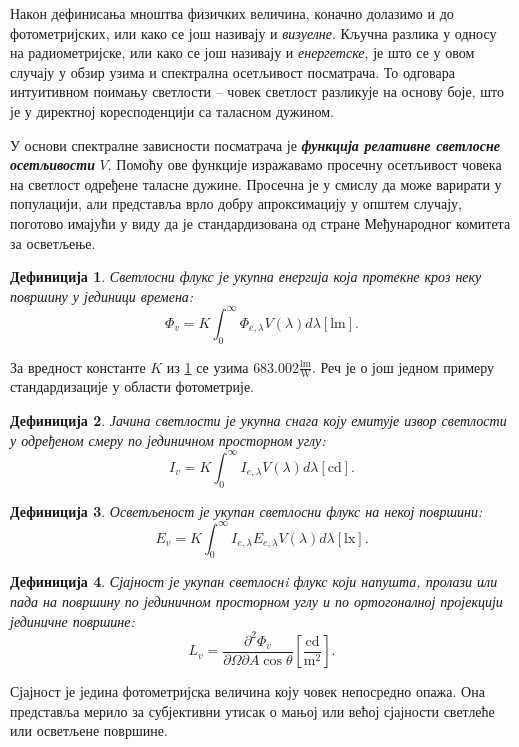 \documentclass[12pt, a4paper, twoside]{book}
\numberwithin{equation}{chapter}
\numberwithin{theorem}{section}
\newtheorem{definition}{Дефиниција}
\numberwithin{definition}{section}
\numberwithin{definitionChapter}{chapter}
\begin{document}
Након дефинисања мноштва физичких величина, коначно долазимо и до фотометријских, или како се
још називају и \textit{визуелне}. Кључна разлика у односу на радиометријске, или како се још
називају и \textit{енергетске}, је што се у овом случају у обзир узима и спектрална
осетљивост посматрача. То одговара интуитивном поимању светлости -- човек светлост разликује на
основу боје, што је у директној коресподенцији са таласном дужином.

У основи спектралне зависности посматрача је \textbf{\textit{функција релативне светлосне осетљивости}} $V$.
Помоћу ове функције изражавамо просечну осетљивост човека на светлост одређене таласне дужине.
Просечна је у смислу да може варирати у популацији, али представља врло добру апроксимацију
у општем случају, поготово имајући у виду да је стандардизована од стране Међународног комитета
за осветљење.

\begin{definition}
	Светлосни флукс је укупна енергија која протекне кроз неку површину у јединици времена:
	$$\Phi_v = K\int_{0}^{\infty}\Phi_{e, \lambda} V(\lambda)d\lambda \left[\mathrm{lm}\right].$$
	\label{eqn-luminuous-flux}
\end{definition}

За вредност константе $K$ из \ref{eqn-luminuous-flux} се узима $683.002 \mathrm{\frac{lm}{W}}$. Реч
је о још једном примеру стандардизације у области фотометрије.

\begin{definition}
	Јачина светлости је укупна снага коју емитује извор светлости у одређеном смеру по јединичном
	просторном углу:
	$$I_v = K \int_{0}^{\infty}I_{e, \lambda}V(\lambda)d\lambda \left[\mathrm{cd}\right].$$
\end{definition}

\begin{definition}
	Осветљеност је укупан светлосни флукс на некој површини:
	$$E_v = K\int_{0}^{\infty}I_{e, \lambda}E_{e, \lambda}V(\lambda)d\lambda \left[\mathrm{lx}\right].$$
\end{definition}

\begin{definition}
	Сјајност је укупан светлоснi флукс који напушта, пролази или пада на површину по јединичном просторном
	углу и по ортогоналној пројекцији јединичне површине:
	$$L_v = \frac{\partial^2\Phi_v}{\partial\Omega\partial A \cos\theta} \left[\mathrm{\frac{cd}{m^2}}\right].$$
\end{definition}

Сјајност је једина фотометријска величина коју човек непосредно опажа. Она представља мерило за субјективни утисак
о мањој или већој сјајности светлеће или осветљене површине.
\end{document}

